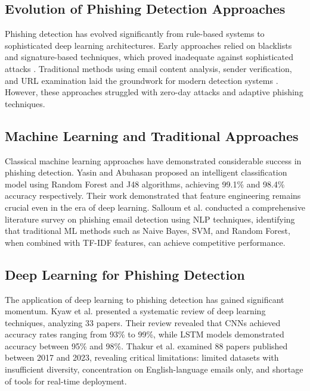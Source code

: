 \documentclass[conference]{IEEEtran}
\begin{document}
\subsection{Evolution of Phishing Detection Approaches}

Phishing detection has evolved significantly from rule-based systems to sophisticated deep learning architectures. Early approaches relied on blacklists and signature-based techniques, which proved inadequate against sophisticated attacks \cite{8}. Traditional methods using email content analysis, sender verification, and URL examination laid the groundwork for modern detection systems \cite{9}. However, these approaches struggled with zero-day attacks and adaptive phishing techniques.

\subsection{Machine Learning and Traditional Approaches}

Classical machine learning approaches have demonstrated considerable success in phishing detection. Yasin and Abuhasan \cite{3} proposed an intelligent classification model using Random Forest and J48 algorithms, achieving 99.1\% and 98.4\% accuracy respectively. Their work demonstrated that feature engineering remains crucial even in the era of deep learning. Salloum et al. \cite{4} conducted a comprehensive literature survey on phishing email detection using NLP techniques, identifying that traditional ML methods such as Naive Bayes, SVM, and Random Forest, when combined with TF-IDF features, can achieve competitive performance.

\subsection{Deep Learning for Phishing Detection}

The application of deep learning to phishing detection has gained significant momentum. Kyaw et al. \cite{10} presented a systematic review of deep learning techniques, analyzing 33 papers. Their review revealed that CNNs achieved accuracy rates ranging from 93\% to 99\%, while LSTM models demonstrated accuracy between 95\% and 98\%. Thakur et al. \cite{11} examined 88 papers published between 2017 and 2023, revealing critical limitations: limited datasets with insufficient diversity, concentration on English-language emails only, and shortage of tools for real-time deployment.
\end{document}
